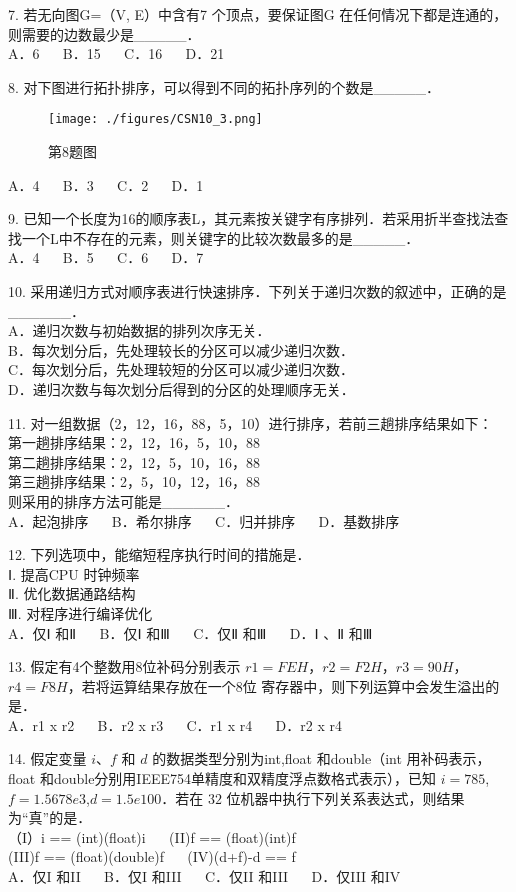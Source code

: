 7. 若无向图G=（V, E）中含有7 个顶点，要保证图G 在任何情况下都是连通的，则需要的边数最少是_____． \\
A．6 $\quad$ B．15 $\quad$ C．16 $\quad$ D．21

8. 对下图进行拓扑排序，可以得到不同的拓扑序列的个数是_____． \\
\begin{figure}[ht]
\centering
\texttt{[image: ./figures/CSN10\_3.png]}
\caption{第8题图} \label{CSN10_fig3}
\end{figure}
A．4 $\quad$ B．3 $\quad$ C．2 $\quad$ D．1

9. 已知一个长度为16的顺序表L，其元素按关键字有序排列．若采用折半查找法查找一个L中不存在的元素，则关键字的比较次数最多的是_____． \\
A．4 $\quad$ B．5 $\quad$ C．6 $\quad$ D．7

10. 采用递归方式对顺序表进行快速排序．下列关于递归次数的叙述中，正确的是______． \\
A．递归次数与初始数据的排列次序无关． \\
B．每次划分后，先处理较长的分区可以减少递归次数． \\
C．每次划分后，先处理较短的分区可以减少递归次数． \\
D．递归次数与每次划分后得到的分区的处理顺序无关．

11. 对一组数据（2，12，16，88，5，10）进行排序，若前三趟排序结果如下： \\
第一趟排序结果：2，12，16，5，10，88 \\
第二趟排序结果：2，12，5，10，16，88 \\
第三趟排序结果：2，5，10，12，16，88 \\
则采用的排序方法可能是______． \\
A．起泡排序 $\quad$ B．希尔排序 $\quad$ C．归并排序 $\quad$ D．基数排序

12. 下列选项中，能缩短程序执行时间的措施是． \\
Ⅰ. 提高CPU 时钟频率 \\
Ⅱ. 优化数据通路结构 \\
Ⅲ. 对程序进行编译优化 \\
A．仅Ⅰ 和Ⅱ $\quad$ B．仅Ⅰ 和Ⅲ $\quad$ C．仅Ⅱ 和Ⅲ $\quad$ D．Ⅰ 、Ⅱ 和Ⅲ

13. 假定有4个整数用8位补码分别表示 $r1=FEH$，$r2=F2H$，$r3=90H$，$r4=F8H$，若将运算结果存放在一个8位
寄存器中，则下列运算中会发生溢出的是． \\
A．r1 x r2 $\quad$ B．r2 x r3 $\quad$ C．r1 x r4 $\quad$ D．r2 x r4

14. 假定变量 $i$、$f$ 和 $d$ 的数据类型分别为int,float 和double（int 用补码表示，float 和double分别用IEEE754单精度和双精度浮点数格式表示），已知 $i=785$,$f=1.5678e3$,$d=1.5e100$．若在 $32$ 位机器中执行下列关系表达式，则结果为“真”的是． \\
（I）i == (int)(float)i $\quad$ (II)f == (float)(int)f \\
(III)f == (float)(double)f $\quad$ (IV)(d+f)-d == f \\
A．仅I 和II $\quad$ B．仅I 和III $\quad$ C．仅II 和III $\quad$ D．仅III 和IV

